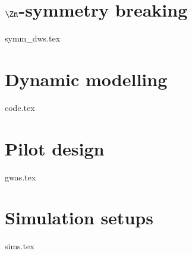 




\section{\(\Zn\)-symmetry breaking}\label{sec:PT:symm_dws}
    {{symm_dws.tex}}


\section{Dynamic modelling}\label{sec:PT:code} %
    {{code.tex}}


\section{Pilot design}\label{sec:PT:gwas}
    {{gwas.tex}}


\section{Simulation setups}\label{sec:PT:sims}
    {{sims.tex}}






